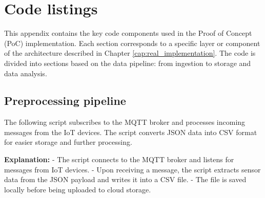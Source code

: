 \appendix
\chapter{Code listings}
\label{appendix:code}

This appendix contains the key code components used in the Proof of Concept (PoC) implementation. Each section corresponds to a specific layer or component of the architecture described in Chapter \ref{cap:real_implementation}. The code is divided into sections based on the data pipeline: from ingestion to storage and data analysis.

\section{Preprocessing pipeline}
\label{sec:prprocessing_impl}

The following script subscribes to the MQTT broker and processes incoming messages from the IoT devices. The script converts JSON data into CSV format for easier storage and further processing.

\textbf{Explanation:}  
- The script connects to the MQTT broker and listens for messages from IoT devices.  
- Upon receiving a message, the script extracts sensor data from the JSON payload and writes it into a CSV file.  
- The file is saved locally before being uploaded to cloud storage.

